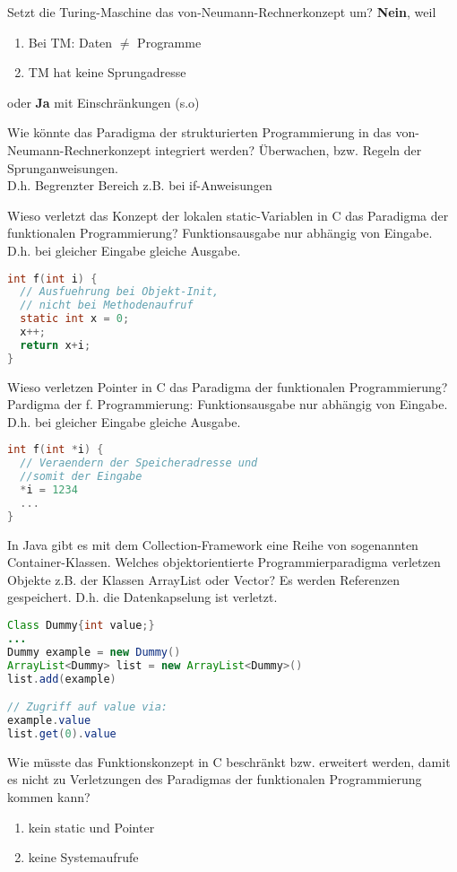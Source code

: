 \begin{card}
	Setzt die Turing-Maschine das von-Neumann-Rechnerkonzept um?
	\hr
	\textbf{Nein}, weil
	\begin{enumerate}
	\item Bei TM: Daten $\neq$ Programme
	\item TM hat keine Sprungadresse
	\end{enumerate}
	oder \textbf{Ja} mit Einschränkungen (s.o)
\end{card}

\begin{card}
	Wie könnte das Paradigma der strukturierten Programmierung in das von-Neumann-Rechnerkonzept integriert werden?
	\hr
	Überwachen, bzw. Regeln der Sprunganweisungen.\\
	D.h. Begrenzter Bereich z.B. bei if-Anweisungen
\end{card}

\begin{card}
	Wieso verletzt das Konzept der lokalen static-Variablen in C das Paradigma der funktionalen
	Programmierung?
	\hr
	Funktionsausgabe nur abhängig von Eingabe. D.h. bei gleicher Eingabe gleiche Ausgabe.
	\begin{lstlisting}[language=C]
int f(int i) {
  // Ausfuehrung bei Objekt-Init, 
  // nicht bei Methodenaufruf
  static int x = 0; 
  x++;
  return x+i;
}
	\end{lstlisting}	
\end{card}

\begin{card}
	Wieso verletzen Pointer in C das Paradigma der funktionalen Programmierung?
	\hr
	Pardigma der f. Programmierung: Funktionsausgabe nur abhängig von Eingabe.  D.h. bei gleicher Eingabe gleiche Ausgabe.
	\begin{lstlisting}[language=C]
int f(int *i) {
  // Veraendern der Speicheradresse und 
  //somit der Eingabe
  *i = 1234
  ...
}
	\end{lstlisting}	
\end{card}

\begin{card}
	In Java gibt es mit dem Collection-Framework eine Reihe von sogenannten Container-Klassen. Welches objektorientierte Programmierparadigma verletzen Objekte z.B. der Klassen	ArrayList oder Vector? 
	\hr
	Es werden Referenzen gespeichert. D.h. die Datenkapselung ist verletzt.
	\begin{lstlisting}[language=Java]
Class Dummy{int value;}
...
Dummy example = new Dummy()
ArrayList<Dummy> list = new ArrayList<Dummy>()
list.add(example)

// Zugriff auf value via:
example.value
list.get(0).value
	\end{lstlisting}	
\end{card}

\begin{card}
	Wie müsste das Funktionskonzept in C beschränkt bzw. erweitert werden, damit es nicht zu Verletzungen des Paradigmas der funktionalen Programmierung kommen kann?
	\hr
	\begin{enumerate}
	\item kein static und Pointer 
	\item keine Systemaufrufe
	\end{enumerate}
\end{card}